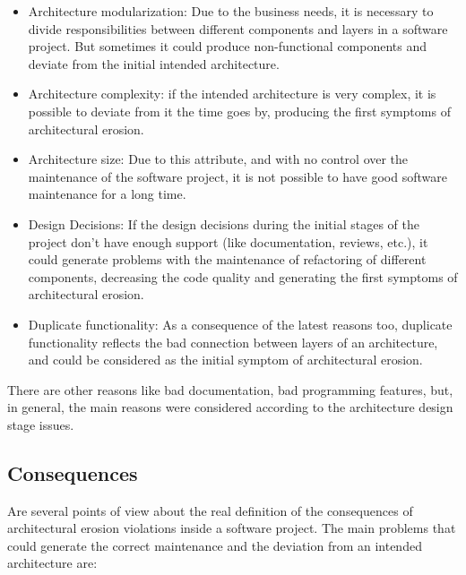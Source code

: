 \begin{itemize}
    \item Architecture modularization: Due to the business needs, it is necessary to divide responsibilities between different components and layers in a software project. But sometimes it could produce non-functional components and deviate from the initial intended architecture.
    \item  Architecture complexity: if the intended architecture is very complex, it is possible to deviate from it the time goes by, producing the first symptoms of architectural erosion.
    \item Architecture size: Due to this attribute, and with no control over the maintenance of the software project, it is not possible to have good software maintenance for a long time.
    \item Design Decisions: If the design decisions during the initial stages of the project don't have enough support (like documentation, reviews, etc.), it could generate problems with the maintenance of refactoring of different components, decreasing the code quality and generating the first symptoms of architectural erosion.
    \item Duplicate functionality: As a consequence of the latest reasons too, duplicate functionality reflects the bad connection between layers of an architecture, and could be considered as the initial symptom of architectural erosion.

\end{itemize}
There are other reasons like bad documentation, bad programming features, but, in general, the main reasons were considered according to the architecture design stage issues.

\subsection{Consequences}
Are several points of view about the real definition of the consequences of architectural erosion violations inside a software project. The main problems that could generate the correct maintenance and the deviation from an intended architecture are:

